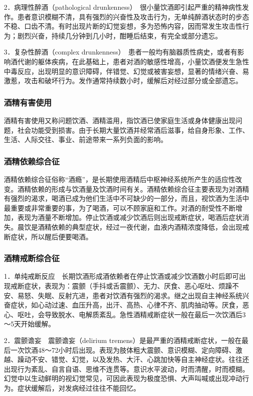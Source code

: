 2．病理性醉酒（pathological
drunkenness）　很小量饮酒即引起严重的精神病性发作。患者意识模糊不清，具有强烈的兴奋性及攻击行为，无单纯醉酒状态时的步态不稳、口齿不清。有时出现片断的幻觉妄想，多为恐怖内容，因而常发生攻击性行为；剧烈兴奋，持续几分钟到几小时，酣睡后结束，有完全或部分遗忘。

3．复杂性醉酒（complex
drunkenness）　患者一般均有脑器质性病史，或者有影响酒代谢的躯体疾病，在此基础上，患者对酒的敏感性增高，小量饮酒便发生急性中毒反应，出现明显的意识障碍，伴错觉、幻觉或被害妄想，显著的情绪兴奋、易激惹，攻击和破坏行为。发作通常持续数小时，缓解后对经过部分或全部遗忘。

\subsubsection{酒精有害使用}

酒精有害使用又称问题饮酒、酒精滥用，指饮酒已使家庭生活或身体健康出现问题，社会功能受到损害。由于长期大量饮酒并经常酒后滋事，给自身形象、工作、生活、人际交往、事业、前途带来一系列负面的影响。

\subsubsection{酒精依赖综合征}

酒精依赖综合征俗称``酒瘾''，是长期使用酒精后中枢神经系统所产生的适应性改变。酒精依赖的形成与饮酒量及饮酒时间有关。酒精依赖综合征主要表现为对酒精有强烈的渴求，喝酒已成为他们生活中不可缺少的一部分，而且，视饮酒为生活中最重要或非常重要的事，为了喝酒，可以不顾家庭和工作。对酒的耐受性不断增加，表现为酒量不断增加。停止饮酒或减少饮酒后则出现戒断症状，喝酒后症状消失。晨饮是酒精依赖的典型症状，经过一夜代谢，血液内酒精浓度降低，会出现戒断症状，所以醒后便要喝酒。

\subsubsection{酒精戒断综合征}

1．单纯戒断反应　长期饮酒形成酒依赖者在停止饮酒或减少饮酒数小时后即可出现戒断症状，表现为：震颤（手抖或舌震颤）、无力、厌食、恶心呕吐、烦躁不安、易怒、失眠、反射亢进，患者对饮酒有强烈的渴求。继之出现自主神经系统兴奋症状，如心动过速、血压升高，出汗、高热、心律不齐、肌肉抽动等。厌食，恶心、呕吐，会导致脱水、电解质紊乱。急性酒精戒断症状一般在最后一次饮酒后3～5天开始缓解。

2．震颤谵妄　震颤谵妄（delirium
tremens）是最严重的酒精戒断症状，一般在最后一次饮酒48～72小时后出现。表现为肢体粗大震颤、意识模糊、定向障碍、激越、躁动不安、错觉、幻觉，以及发热、大汗、心跳加快等自主神经症状。往往还出现行为紊乱、自言自语、思维不连贯等。意识水平波动，时而清醒，时而模糊。幻觉中以生动鲜明的视幻觉常见，可因此表现为极度恐惧、大声叫喊或出现冲动行为。症状缓解后，对发病经过往往不能回忆。

